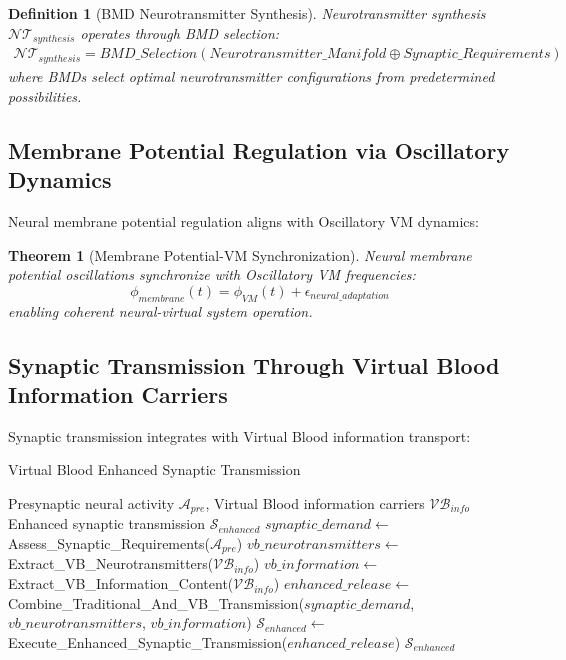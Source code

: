 \documentclass[12pt,a4paper]{article}
\newtheorem{theorem}{Theorem}
\newtheorem{definition}{Definition}
\begin{document}
\begin{definition}[BMD Neurotransmitter Synthesis]
Neurotransmitter synthesis $\mathcal{NT}_{synthesis}$ operates through BMD selection:
\begin{align}
\mathcal{NT}_{synthesis} = BMD\_Selection(Neurotransmitter\_Manifold \oplus Synaptic\_Requirements)
\end{align}
where BMDs select optimal neurotransmitter configurations from predetermined possibilities.
\end{definition}

\subsection{Membrane Potential Regulation via Oscillatory Dynamics}

Neural membrane potential regulation aligns with Oscillatory VM dynamics:

\begin{theorem}[Membrane Potential-VM Synchronization]
Neural membrane potential oscillations synchronize with Oscillatory VM frequencies:
\begin{equation}
\phi_{membrane}(t) = \phi_{VM}(t) + \epsilon_{neural\_adaptation}
\end{equation}
enabling coherent neural-virtual system operation.
\end{theorem}

\subsection{Synaptic Transmission Through Virtual Blood Information Carriers}

Synaptic transmission integrates with Virtual Blood information transport:

\begin{algorithm}
\caption{Virtual Blood Enhanced Synaptic Transmission}
\begin{algorithmic}[1]
\Require Presynaptic neural activity $\mathcal{A}_{pre}$, Virtual Blood information carriers $\mathcal{VB}_{info}$
\Ensure Enhanced synaptic transmission $\mathcal{S}_{enhanced}$
\State $synaptic\_demand \leftarrow$ Assess\_Synaptic\_Requirements($\mathcal{A}_{pre}$)
\State $vb\_neurotransmitters \leftarrow$ Extract\_VB\_Neurotransmitters($\mathcal{VB}_{info}$)
\State $vb\_information \leftarrow$ Extract\_VB\_Information\_Content($\mathcal{VB}_{info}$)
\State $enhanced\_release \leftarrow$ Combine\_Traditional\_And\_VB\_Transmission($synaptic\_demand$, $vb\_neurotransmitters$, $vb\_information$)
\State $\mathcal{S}_{enhanced} \leftarrow$ Execute\_Enhanced\_Synaptic\_Transmission($enhanced\_release$)
\State \Return $\mathcal{S}_{enhanced}$
\end{algorithmic}
\end{algorithm}
\end{document}
